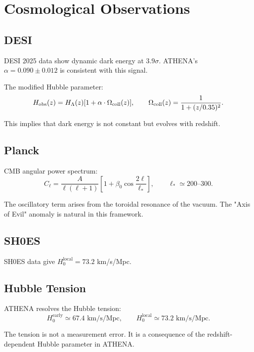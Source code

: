 \documentclass[12pt,oneside]{book}
\begin{document}
\chapter{Cosmological Observations}

\section{DESI}

DESI 2025 data show dynamic dark energy at $3.9\sigma$. ATHENA's $\alpha = 0.090 \pm 0.012$ is consistent with this signal.

The modified Hubble parameter:
\[
H_{\rm obs}(z) = H_\Lambda(z) [1 + \alpha \cdot \Omega_{\rm coll}(z)], \qquad \Omega_{\rm coll}(z) = \frac{1}{1 + (z/0.35)^2}.
\]

This implies that dark energy is not constant but evolves with redshift.

\section{Planck}

CMB angular power spectrum:
\[
C_\ell = \frac{A}{\ell(\ell+1)} \left[1 + \beta_0 \cos\frac{2\ell}{\ell_*}\right], \qquad \ell_* \simeq 200\text{--}300.
\]

The oscillatory term arises from the toroidal resonance of the vacuum. The "Axis of Evil" anomaly is natural in this framework.

\section{SH0ES}

SH0ES data give $H_0^{\text{local}} = 73.2$ km/s/Mpc.

\section{Hubble Tension}

ATHENA resolves the Hubble tension:
\[
H_0^{\text{early}} \simeq 67.4 \text{ km/s/Mpc}, \qquad H_0^{\text{local}} \simeq 73.2 \text{ km/s/Mpc}.
\]

The tension is not a measurement error. It is a consequence of the redshift-dependent Hubble parameter in ATHENA.
\end{document}
